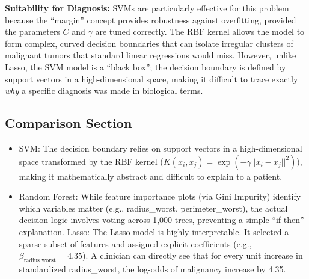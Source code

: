 \documentclass[
]{article}
\providecommand{\tightlist}{%
  \setlength{\itemsep}{0pt}\setlength{\parskip}{0pt}}
\begin{document}
\textbf{Suitability for Diagnosis:} SVMs are particularly effective for
this problem because the ``margin'' concept provides robustness against
overfitting, provided the parameters \(C\) and \(\gamma\) are tuned
correctly. The RBF kernel allows the model to form complex, curved
decision boundaries that can isolate irregular clusters of malignant
tumors that standard linear regressions would miss. However, unlike
Lasso, the SVM model is a ``black box''; the decision boundary is
defined by support vectors in a high-dimensional space, making it
difficult to trace exactly \emph{why} a specific diagnosis was made in
biological terms.

\subsection{Comparison Section}\label{comparison-section}

\begin{itemize}
\tightlist
\item
  SVM: The decision boundary relies on support vectors in a
  high-dimensional space transformed by the RBF kernel
  (\(K(x_i, x_j) = \exp(-\gamma ||x_i - x_j||^2)\)), making it
  mathematically abstract and difficult to explain to a patient.
\item
  Random Forest: While feature importance plots (via Gini Impurity)
  identify which variables matter (e.g., radius\_worst,
  perimeter\_worst), the actual decision logic involves voting across
  1,000 trees, preventing a simple ``if-then'' explanation. Lasso: The
  Lasso model is highly interpretable. It selected a sparse subset of
  features and assigned explicit coefficients (e.g.,
  \(\beta_{\text{radius\_worst}} = 4.35\)). A clinician can directly see
  that for every unit increase in standardized radius\_worst, the
  log-odds of malignancy increase by 4.35.
\end{itemize}
\end{document}
